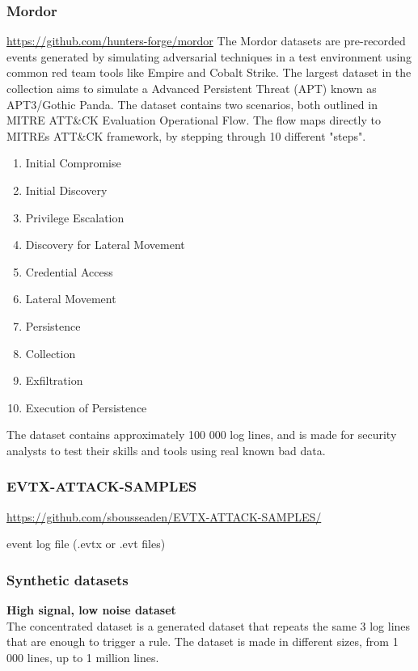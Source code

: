\subsubsection{Mordor}
\url{https://github.com/hunters-forge/mordor}
The Mordor datasets are pre-recorded events generated by simulating adversarial techniques in a test environment using common red team tools like Empire and Cobalt Strike. The largest dataset in the collection aims to simulate a Advanced Persistent Threat (APT) known as APT3/Gothic Panda. The dataset contains two scenarios, both outlined in MITRE ATT\&CK Evaluation Operational Flow. The flow maps directly to MITREs ATT\&CK framework, by stepping through 10 different "steps".

\begin{enumerate}
\item Initial Compromise
\item Initial Discovery
\item Privilege Escalation
\item Discovery for Lateral Movement
\item Credential Access
\item Lateral Movement
\item Persistence
\item Collection
\item Exfiltration
\item Execution of Persistence
\end{enumerate}

The dataset contains approximately 100 000 log lines, and is made for security analysts to test their skills and tools using real known bad data.

\subsubsection{EVTX-ATTACK-SAMPLES}
\url{https://github.com/sbousseaden/EVTX-ATTACK-SAMPLES/}

event log file (.evtx or .evt files) \textcite{windows_events_docs}

\subsubsection{Synthetic datasets}

\textbf{High signal, low noise dataset}\\
The concentrated dataset is a generated dataset that repeats the same 3 log lines that are enough to trigger a rule. The dataset is made in different sizes, from 1 000 lines, up to 1 million lines.

